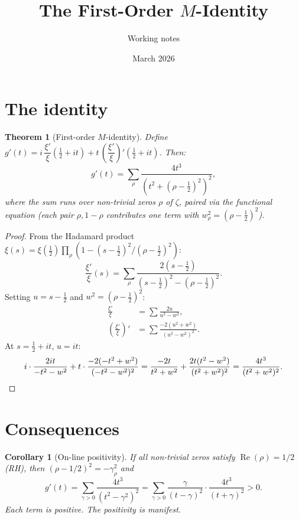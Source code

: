 \documentclass[11pt,a4paper]{article}
\title{The First-Order $M$-Identity}
\author{Working notes}
\date{March 2026}
\newtheorem{theorem}{Theorem}
\newtheorem{corollary}{Corollary}
\DeclareMathOperator{\re}{Re}
\begin{document}
\maketitle

\section{The identity}

\begin{theorem}[First-order $M$-identity]\label{thm:identity}
Define $g'(t) = i\,\dfrac{\xi'}{\xi}(\tfrac{1}{2}+it)
+ t\,\left(\dfrac{\xi'}{\xi}\right)'(\tfrac{1}{2}+it)$.
Then:
\begin{equation}\label{eq:identity}
  g'(t) = \sum_\rho \frac{4t^3}{(t^2 + (\rho-\tfrac{1}{2})^2)^2},
\end{equation}
where the sum runs over non-trivial zeros $\rho$ of $\zeta$,
paired via the functional equation (each pair $\rho, 1-\rho$
contributes one term with
$w_\rho^2 = (\rho - \tfrac{1}{2})^2$).
\end{theorem}

\begin{proof}
From the Hadamard product
$\xi(s) = \xi(\tfrac{1}{2})\prod_\rho
(1 - (s-\tfrac{1}{2})^2/(\rho-\tfrac{1}{2})^2)$:
\[
  \frac{\xi'}{\xi}(s)
  = \sum_\rho \frac{2(s-\tfrac{1}{2})}{(s-\tfrac{1}{2})^2
    - (\rho-\tfrac{1}{2})^2}.
\]
Setting $u = s - \tfrac{1}{2}$ and $w^2 = (\rho-\tfrac{1}{2})^2$:
\begin{align*}
  \frac{\xi'}{\xi} &= \sum \frac{2u}{u^2 - w^2}, \\[4pt]
  \left(\frac{\xi'}{\xi}\right)'
  &= \sum \frac{-2(u^2 + w^2)}{(u^2 - w^2)^2}.
\end{align*}
At $s = \tfrac{1}{2} + it$, $u = it$:
\[
  i \cdot \frac{2it}{-t^2 - w^2}
  + t \cdot \frac{-2(-t^2 + w^2)}{(-t^2-w^2)^2}
  = \frac{-2t}{t^2+w^2}
  + \frac{2t(t^2-w^2)}{(t^2+w^2)^2}
  = \frac{4t^3}{(t^2+w^2)^2}. \qedhere
\]
\end{proof}

\section{Consequences}

\begin{corollary}[On-line positivity]
If all non-trivial zeros satisfy $\re(\rho) = 1/2$ (RH), then
$(\rho-1/2)^2 = -\gamma_\rho^2$ and
\begin{equation}
  g'(t) = \sum_{\gamma > 0}
    \frac{4t^3}{(t^2-\gamma^2)^2}
  = \sum_{\gamma > 0}
    \frac{\gamma}{(t-\gamma)^2} \cdot \frac{4t^3}{(t+\gamma)^2}
  > 0.
\end{equation}
Each term is positive. The positivity is manifest.
\end{corollary}
\end{document}

